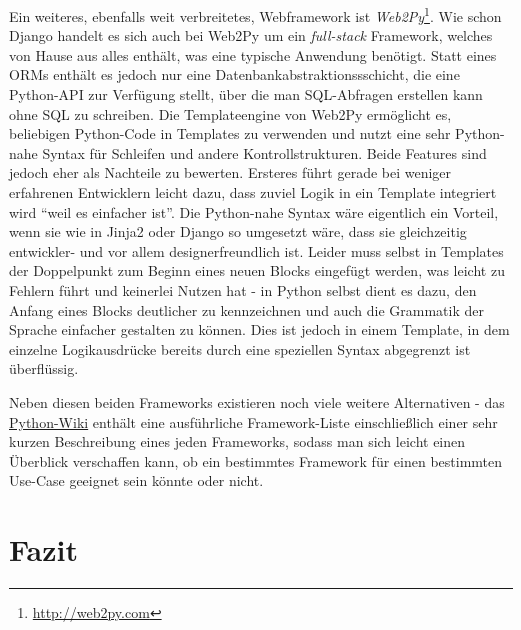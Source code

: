 Ein weiteres, ebenfalls weit verbreitetes, Webframework ist
\emph{Web2Py}\footnote{\href{http://web2py.com}{http://web2py.com}}. Wie schon Django handelt es
sich auch bei Web2Py um ein \emph{full-stack} Framework, welches von Hause aus alles enthält, was
eine typische Anwendung benötigt. Statt eines ORMs enthält es jedoch nur eine
Datenbankabstraktionssschicht, die eine Python-API zur Verfügung stellt, über die man SQL-Abfragen
erstellen kann ohne SQL zu schreiben. Die Templateengine von Web2Py ermöglicht es, beliebigen
Python-Code in Templates zu verwenden und nutzt eine sehr Python-nahe Syntax für Schleifen und
andere Kontrollstrukturen. Beide Features sind jedoch eher als Nachteile zu bewerten. Ersteres führt
gerade bei weniger erfahrenen Entwicklern leicht dazu, dass zuviel Logik in ein Template integriert
wird \enquote{weil es einfacher ist}. Die Python-nahe Syntax wäre eigentlich ein Vorteil, wenn sie
wie in Jinja2 oder Django so umgesetzt wäre, dass sie gleichzeitig entwickler- und vor allem
designerfreundlich ist. Leider muss selbst in Templates der Doppelpunkt zum Beginn eines neuen
Blocks eingefügt werden, was leicht zu Fehlern führt und keinerlei Nutzen hat - in Python selbst
dient es dazu, den Anfang eines Blocks deutlicher zu kennzeichnen und auch die Grammatik der Sprache
einfacher gestalten zu können. Dies ist jedoch in einem Template, in dem einzelne Logikausdrücke
bereits durch eine speziellen Syntax abgegrenzt ist überflüssig.

Neben diesen beiden Frameworks existieren noch viele weitere Alternativen - das
\href{http://wiki.python.org/moin/WebFrameworks}{Python-Wiki} enthält eine ausführliche
Framework-Liste einschließlich einer sehr kurzen Beschreibung eines jeden Frameworks, sodass man
sich leicht einen Überblick verschaffen kann, ob ein bestimmtes Framework für einen bestimmten
Use-Case geeignet sein könnte oder nicht.

\section{Fazit}
